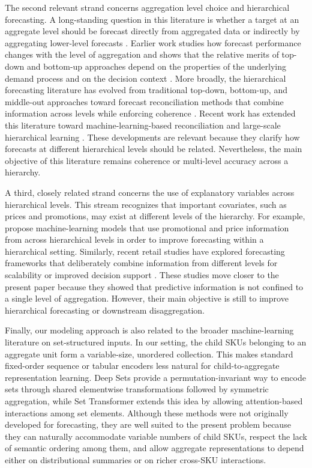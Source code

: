 \documentclass[12pt]{article}
\begin{document}
The second relevant strand concerns aggregation level choice and hierarchical forecasting. A long-standing question in this literature is whether a target at an aggregate level should be forecast directly from aggregated data or indirectly by aggregating lower-level forecasts \parencite{ZOTTERI200774}. Earlier work studies how forecast performance changes with the level of aggregation and shows that the relative merits of top-down and bottom-up approaches depend on the properties of the underlying demand process and on the decision context \parencite{ZOTTERI2005479, sbrana2013aggregate}. More broadly, the hierarchical forecasting literature has evolved from traditional top-down, bottom-up, and middle-out approaches toward forecast reconciliation methods that combine information across levels while enforcing coherence \parencite{HYNDMAN20112579, athanasopoulos2024reconciliation}. Recent work has extended this literature toward machine-learning-based reconciliation and large-scale hierarchical learning \parencite{spiliotis2021mlreconciliation, sprangers2024scale}. These developments are relevant because they clarify how forecasts at different hierarchical levels should be related. Nevertheless, the main objective of this literature remains coherence or multi-level accuracy across a hierarchy.

A third, closely related strand concerns the use of explanatory variables across hierarchical levels. This stream recognizes that important covariates, such as prices and promotions, may exist at different levels of the hierarchy. For example, \textcite{abolghasemi2024hierarchicalml} propose machine-learning models that use promotional and price information from across hierarchical levels in order to improve forecasting within a hierarchical setting. Similarly, recent retail studies have explored forecasting frameworks that deliberately combine information from different levels for scalability or improved decision support \parencite{long2025topdown, taghiyeh2023multiphase}. These studies move closer to the present paper because they showed that predictive information is not confined to a single level of aggregation. However, their main objective is still to improve hierarchical forecasting or downstream disaggregation.

Finally, our modeling approach is also related to the broader machine-learning literature on set-structured inputs. In our setting, the child SKUs belonging to an aggregate unit form a variable-size, unordered collection. This makes standard fixed-order sequence or tabular encoders less natural for child-to-aggregate representation learning. Deep Sets \parencite{zaheer2017deepsets} provide a permutation-invariant way to encode sets through shared elementwise transformations followed by symmetric aggregation, while Set Transformer \parencite{lee2019settransformer} extends this idea by allowing attention-based interactions among set elements. Although these methods were not originally developed for forecasting, they are well suited to the present problem because they can naturally accommodate variable numbers of child SKUs, respect the lack of semantic ordering among them, and allow aggregate representations to depend either on distributional summaries or on richer cross-SKU interactions.
\end{document}
